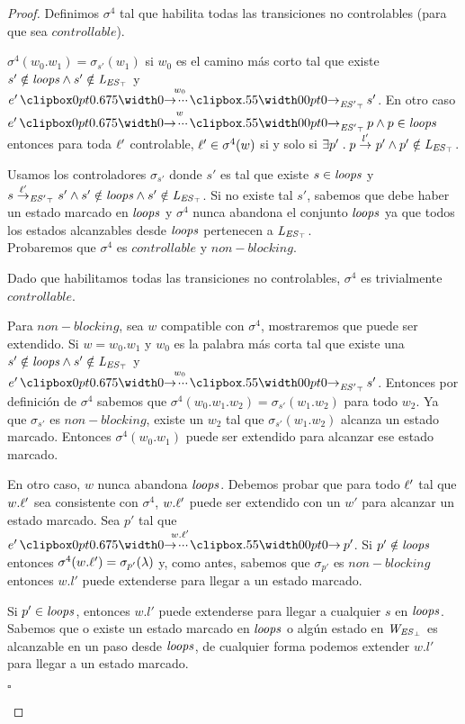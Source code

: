 \begin{proof}
Definimos $\sigma^4$ tal que habilita todas las transiciones no controlables (para que sea $controllable$).

$\sigma^4(w_0.w_1) = \sigma_{s'}(w_1)$ si $w_0$ es el camino más corto tal que existe $s' \notin \mathit{loops} \wedge s'\notin \mathit{L_{\mathit{{\mathit{ES}}_{\top}}}}$ y $e' \runw{w_0}{\unexploredToTop{\structure'}} s'$.
En otro caso $e' \runw{w}{\unexploredToTop{\structure'}} p \wedge p \in \SCC$ entonces para toda $\ell'$ controlable, $\ell' \in\sigma^4(w)$ si y solo si $\exists  p' \;.\; p \overset{l'}{\rightarrow}_{} p' \wedge p' \notin \mathit{L_{\mathit{{\mathit{ES}}_{\top}}}}$.

Usamos los controladores $\sigma_{s'}$ donde $s'$ es tal que existe $s \in \mathit{loops}$ y $s\overset{\ell'}{\rightarrow}_{\mathit{{\mathit{ES}'}_{\top}}} s'\wedge s' \notin \mathit{loops} \wedge s'\notin \mathit{L_{\mathit{{\mathit{ES}}_{\top}}}}$. Si no existe tal $s'$, sabemos que debe haber un estado marcado en $\mathit{loops}$ y $\sigma^4$ nunca abandona el conjunto $\mathit{loops}$ ya que todos los estados alcanzables desde $\mathit{loops}$ pertenecen a $\mathit{L_{\mathit{{\mathit{ES}}_{\top}}}}$.\\

Probaremos que $\sigma^4$ es $controllable$ y $non-blocking$.

Dado que habilitamos todas las transiciones no controlables, $\sigma^4$ es trivialmente $controllable$.

Para $non-blocking$, sea $w$ compatible con $\sigma^4$, mostraremos que puede ser extendido. Si $w = w_0.w_1$ y $w_0$ es la palabra más corta tal que existe una $s' \notin \mathit{loops} \wedge s' \notin \mathit{L_{\mathit{{\mathit{ES}}_{\top}}}}$ y $e' \runw{w_0}{\unexploredToTop{\structure'}} s'$. Entonces por definición de $\sigma^4$ sabemos que  $\sigma^4(w_0.w_1.w_2) = \sigma_{s'}(w_1.w_2)$ para todo $w_2$. Ya que $\sigma_{s'}$ es $non-blocking$, existe un $w_2$ tal que $\sigma_{s'}(w_1.w_2)$ alcanza un estado marcado. Entonces $\sigma^4(w_0.w_1)$ puede ser extendido para alcanzar ese estado marcado. 

En otro caso, $w$ nunca abandona $\mathit{loops}$. Debemos probar que para todo $\ell'$ tal que $w.\ell'$ sea consistente con $\sigma^4$, $w.\ell'$ puede ser extendido con un $w'$ para alcanzar un estado marcado. Sea $p'$ tal que $e' \runw{w.\l'}{} p'$. Si $p' \notin \mathit{loops}$ entonces $\sigma^4(w.\ell') = \sigma_{p'}(\lambda)$ y, como antes, sabemos que $\sigma_{p'}$ es $non-blocking$ entonces $w.l'$ puede extenderse para llegar a un estado marcado.

Si $p' \in \mathit{loops}$, entonces $w.l'$ puede extenderse para llegar a cualquier $s$ en $\mathit{loops}$. Sabemos que o existe un estado marcado en $\mathit{loops}$ o algún estado en $\mathit{W_{\mathit{{\mathit{ES}}_{\bot}}}}$ es alcanzable en un paso desde $\mathit{loops}$, de cualquier forma podemos extender $w.l'$ para llegar a un estado marcado.\\
\begin{flushright}
	$\square$
\end{flushright}
\end{proof}


